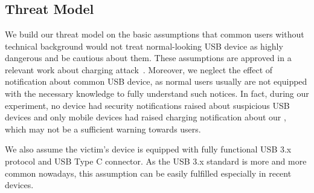 \section{\tool}
\label{sec:badusb}
\subsection{Threat Model}

We build our threat model on the basic assumptions that common users without
technical background would not treat normal-looking USB device as highly
dangerous and be cautious about them. These assumptions are approved in a
relevant work about charging attack~\cite{JFCImpact}. Moreover, we neglect the
effect of notification about common USB device, as normal users usually are not
equipped with the necessary knowledge to fully understand such notices. In
fact, during our experiment, no device had security notifications raised about
suspicious USB devices and only mobile devices had raised charging notification
about our \tool, which may not be a sufficient warning towards users.

We also assume the victim's device is equipped with fully functional USB 3.x
protocol and USB Type C connector. As the USB 3.x standard is more and more
common nowadays, this assumption can be easily fulfilled especially in recent
devices.


